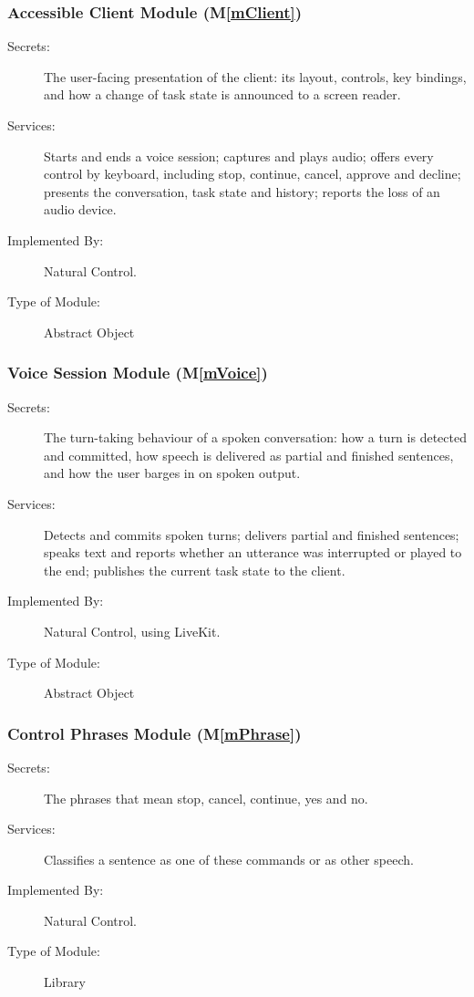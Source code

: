 \documentclass[12pt, titlepage]{article}
\newcommand{\progname}{Natural Control}
\newcommand{\mref}[1]{M\ref{#1}}
\begin{document}
\subsubsection{Accessible Client Module (\mref{mClient})}
\begin{description}
\item[Secrets:] The user-facing presentation of the client: its layout,
controls, key bindings, and how a change of task state is announced to a screen
reader.
\item[Services:] Starts and ends a voice session; captures and plays audio;
offers every control by keyboard, including stop, continue, cancel, approve
and decline; presents the conversation, task state and history; reports the
loss of an audio device.
\item[Implemented By:] \progname{}.
\item[Type of Module:] Abstract Object
\end{description}

\subsubsection{Voice Session Module (\mref{mVoice})}
\begin{description}
\item[Secrets:] The turn-taking behaviour of a spoken conversation: how a
turn is detected and committed, how speech is delivered as partial and finished
sentences, and how the user barges in on spoken output.
\item[Services:] Detects and commits spoken turns; delivers partial and
finished sentences; speaks text and reports whether an utterance was
interrupted or played to the end; publishes the current task state to the
client.
\item[Implemented By:] \progname{}, using LiveKit.
\item[Type of Module:] Abstract Object
\end{description}

\subsubsection{Control Phrases Module (\mref{mPhrase})}
\begin{description}
\item[Secrets:] The phrases that mean stop, cancel, continue, yes and no.
\item[Services:] Classifies a sentence as one of these commands or as other
speech.
\item[Implemented By:] \progname{}.
\item[Type of Module:] Library
\end{description}
\end{document}
